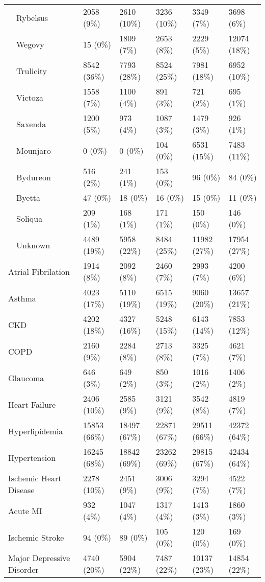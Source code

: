 \begin{longtable}{p{}p{}p{}p{}p{}p{}}
    Rybelsus & 2058 (9\%) & 2610 (10\%) & 3236 (10\%) & 3349 (7\%) & 3698 (6\%) \\ 
    Wegovy & 15 (0\%) & 1809 (7\%) & 2653 (8\%) & 2229 (5\%) & 12074 (18\%) \\ 
    Trulicity & 8542 (36\%) & 7793 (28\%) & 8524 (25\%) & 7981 (18\%) & 6952 (10\%) \\ 
    Victoza & 1558 (7\%) & 1100 (4\%) & 891 (3\%) & 721 (2\%) & 695 (1\%) \\ 
    Saxenda & 1200 (5\%) & 973 (4\%) & 1087 (3\%) & 1479 (3\%) & 926 (1\%) \\ 
    Mounjaro & 0 (0\%) & 0 (0\%) & 104 (0\%) & 6531 (15\%) & 7483 (11\%) \\ 
    Bydureon & 516 (2\%) & 241 (1\%) & 153 (0\%) & 96 (0\%) & 84 (0\%) \\ 
    Byetta & 47 (0\%) & 18 (0\%) & 16 (0\%) & 15 (0\%) & 11 (0\%) \\ 
    Soliqua & 209 (1\%) & 168 (1\%) & 171 (1\%) & 150 (0\%) & 146 (0\%) \\ 
    Unknown & 4489 (19\%) & 5958 (22\%) & 8484 (25\%) & 11982 (27\%) & 17954 (27\%) \\ 
  Atrial Fibrilation & 1914 (8\%) & 2092 (8\%) & 2460 (7\%) & 2993 (7\%) & 4200 (6\%) \\ 
  Asthma & 4023 (17\%) & 5110 (19\%) & 6515 (19\%) & 9060 (20\%) & 13657 (21\%) \\ 
  CKD & 4202 (18\%) & 4327 (16\%) & 5248 (15\%) & 6143 (14\%) & 7853 (12\%) \\ 
  COPD & 2160 (9\%) & 2284 (8\%) & 2713 (8\%) & 3325 (7\%) & 4621 (7\%) \\ 
  Glaucoma & 646 (3\%) & 649 (2\%) & 850 (3\%) & 1016 (2\%) & 1406 (2\%) \\ 
  Heart Failure & 2406 (10\%) & 2585 (9\%) & 3121 (9\%) & 3542 (8\%) & 4819 (7\%) \\ 
  Hyperlipidemia & 15853 (66\%) & 18497 (67\%) & 22871 (67\%) & 29511 (66\%) & 42372 (64\%) \\ 
  Hypertension & 16245 (68\%) & 18842 (69\%) & 23262 (69\%) & 29815 (67\%) & 42434 (64\%) \\ 
  Ischemic Heart Disease & 2278 (10\%) & 2451 (9\%) & 3006 (9\%) & 3294 (7\%) & 4522 (7\%) \\ 
  Acute MI & 932 (4\%) & 1047 (4\%) & 1317 (4\%) & 1413 (3\%) & 1860 (3\%) \\ 
  Ischemic Stroke & 94 (0\%) & 89 (0\%) & 105 (0\%) & 120 (0\%) & 169 (0\%) \\ 
  Major Depressive Disorder & 4740 (20\%) & 5904 (22\%) & 7487 (22\%) & 10137 (23\%) & 14854 (22\%) \\ 

\end{longtable}
